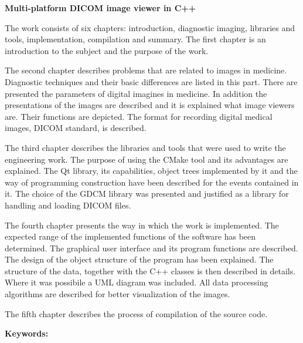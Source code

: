 \begin{center}
\large \bf
Multi-platform DICOM image viewer in C++
\end{center}


The work consists of six chapters: introduction, diagnostic imaging, libraries and tools, implementation, compilation and summary.
The first chapter is an introduction to the subject and the purpose of the work.
\par
The second chapter describes problems that are related to images in medicine.
Diagnostic techniques and their basic differences are listed in this part.
There are presented the parameters of digital imagines in medicine.
In addition the presentations of the images are described and it is explained what image viewers are.
Their functions are depicted.
The format for recording digital medical images, DICOM standard, is described.
\par
The third chapter describes the libraries and tools that were used to write the engineering work.
The purpose of using the CMake tool and its advantages are explained.
The Qt library, its capabilities, object trees implemented by it and the way of programming construction have been described for the events contained in it.
The choice of the GDCM library was presented and justified as a library for handling  and loading DICOM files.
\par
The fourth chapter presents the way in which the work is implemented.
The expected range of the implemented functions of the software has been determined.
The graphical user interface and its program functions are described.
The design of the object structure of the program has been explained.
The structure of the data, together with the C++ classes is then described in details.
Where it was possibile a UML diagram was included.
All data processing algorithms are described for better  visualization of the images.
\par
The fifth chapter describes the process of compilation of the source code.

\bigskip
{\noindent\bf Keywords:} \keywordsEng

\vfill

